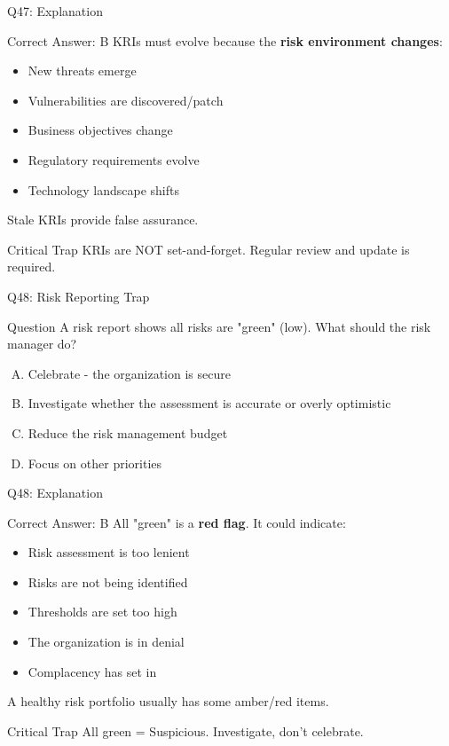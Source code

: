 \documentclass{beamer}
\begin{document}
	\begin{frame}{Q47: Explanation}
		\begin{block}{Correct Answer: B}
			KRIs must evolve because the \textbf{risk environment changes}:
			\begin{itemize}
				\item New threats emerge
				\item Vulnerabilities are discovered/patch
				\item Business objectives change
				\item Regulatory requirements evolve
				\item Technology landscape shifts
			\end{itemize}
			Stale KRIs provide false assurance.
		\end{block}
		\begin{alertblock}{Critical Trap}
			KRIs are NOT set-and-forget.
			Regular review and update is required.
		\end{alertblock}
	\end{frame}
	
	\begin{frame}{Q48: Risk Reporting Trap}
		\begin{block}{Question}
			A risk report shows all risks are "green" (low). What should the risk manager do?
		\end{block}
		\begin{enumerate}[(A)]
			\item Celebrate - the organization is secure
			\item Investigate whether the assessment is accurate or overly optimistic
			\item Reduce the risk management budget
			\item Focus on other priorities
		\end{enumerate}
	\end{frame}
	
	\begin{frame}{Q48: Explanation}
		\begin{block}{Correct Answer: B}
			All "green" is a \textbf{red flag}. It could indicate:
			\begin{itemize}
				\item Risk assessment is too lenient
				\item Risks are not being identified
				\item Thresholds are set too high
				\item The organization is in denial
				\item Complacency has set in
			\end{itemize}
			A healthy risk portfolio usually has some amber/red items.
		\end{block}
		\begin{alertblock}{Critical Trap}
			All green = Suspicious.
			Investigate, don't celebrate.
		\end{alertblock}
	\end{frame}
	
\end{document}
